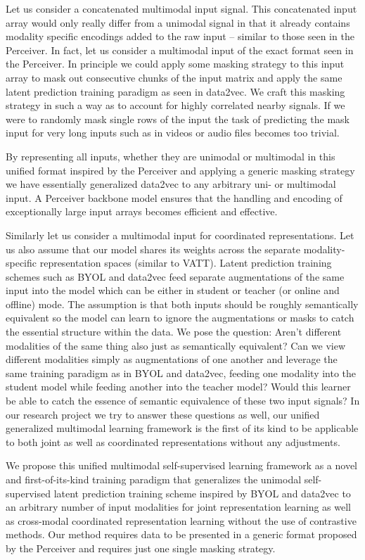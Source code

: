 \documentclass[
]{krantz}
\begin{document}
Let us consider a concatenated multimodal input signal. This concatenated input array would only really differ from a unimodal signal in that it already contains modality specific encodings added to the raw input -- similar to those seen in the Perceiver. In fact, let us consider a multimodal input of the exact format seen in the Perceiver. In principle we could apply some masking strategy to this input array to mask out consecutive chunks of the input matrix and apply the same latent prediction training paradigm as seen in data2vec. We craft this masking strategy in such a way as to account for highly correlated nearby signals. If we were to randomly mask single rows of the input the task of predicting the mask input for very long inputs such as in videos or audio files becomes too trivial.

By representing all inputs, whether they are unimodal or multimodal in this unified format inspired by the Perceiver and applying a generic masking strategy we have essentially generalized data2vec to any arbitrary uni- or multimodal input. A Perceiver backbone model ensures that the handling and encoding of exceptionally large input arrays becomes efficient and effective.

Similarly let us consider a multimodal input for coordinated representations. Let us also assume that our model shares its weights across the separate modality-specific representation spaces (similar to VATT). Latent prediction training schemes such as BYOL and data2vec feed separate augmentations of the same input into the model which can be either in student or teacher (or online and offline) mode. The assumption is that both inputs should be roughly semantically equivalent so the model can learn to ignore the augmentations or masks to catch the essential structure within the data. We pose the question: Aren't different modalities of the same thing also just as semantically equivalent? Can we view different modalities simply as augmentations of one another and leverage the same training paradigm as in BYOL and data2vec, feeding one modality into the student model while feeding another into the teacher model? Would this learner be able to catch the essence of semantic equivalence of these two input signals? In our research project we try to answer these questions as well, our unified generalized multimodal learning framework is the first of its kind to be applicable to both joint as well as coordinated representations without any adjustments.

We propose this unified multimodal self-supervised learning framework as a novel and first-of-its-kind training paradigm that generalizes the unimodal self-supervised latent prediction training scheme inspired by BYOL and data2vec to an arbitrary number of input modalities for joint representation learning as well as cross-modal coordinated representation learning without the use of contrastive methods. Our method requires data to be presented in a generic format proposed by the Perceiver and requires just one single masking strategy.
\end{document}
